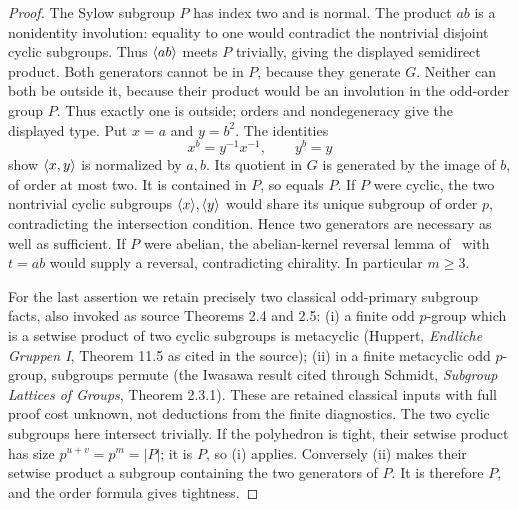 \begin{proof}
The Sylow subgroup $P$ has index two and is normal. The product
$ab$ is a nonidentity involution: equality to one would contradict
the nontrivial disjoint cyclic subgroups. Thus $\langle ab\rangle$ meets
$P$ trivially, giving the displayed semidirect product.
Both generators cannot be in $P$, because they generate $G$.
Neither can both be outside it, because their product would be
an involution in the odd-order group $P$. Thus exactly one is outside;
orders and nondegeneracy give the displayed type.
Put $x=a$ and $y=b^2$. The identities
\[
x^b=y^{-1}x^{-1},\qquad y^b=y
\]
show $\langle x,y\rangle$ is normalized by $a,b$. Its quotient in $G$
is generated by the image of $b$, of order at most two.
It is contained in $P$, so equals $P$. If $P$ were cyclic, the
two nontrivial cyclic subgroups $\langle x\rangle,\langle y\rangle$ would share
its unique subgroup of order $p$, contradicting the intersection
condition. Hence two generators are necessary as well as sufficient.
If $P$ were abelian, the abelian-kernel reversal lemma of~\cite{UF} with $t=ab$ would
supply a reversal, contradicting chirality. In particular $m\geq3$.

For the last assertion we retain precisely two classical odd-primary
subgroup facts, also invoked as source Theorems 2.4 and 2.5:
(i) a finite odd $p$-group which is a setwise product of two cyclic
subgroups is metacyclic (Huppert, \emph{Endliche Gruppen I},
Theorem 11.5 as cited in the source);
(ii) in a finite metacyclic odd $p$-group, subgroups permute
(the Iwasawa result cited through Schmidt, \emph{Subgroup Lattices
of Groups}, Theorem 2.3.1).
These are retained classical inputs with full proof cost unknown,
not deductions from the finite diagnostics.
The two cyclic subgroups here intersect trivially. If the polyhedron
is tight, their setwise product has size $p^{u+v}=p^m=|P|$;
it is $P$, so (i) applies. Conversely (ii) makes their setwise
product a subgroup containing the two generators of $P$.
It is therefore $P$, and the order formula gives tightness.
\end{proof}

